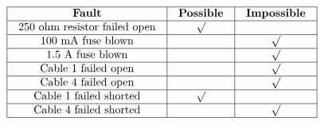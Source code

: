 






$$\vbox{\offinterlineskip
\halign{\strut
\vrule \quad\hfil # \ \hfil & 
\vrule \quad\hfil # \ \hfil & 
\vrule \quad\hfil # \ \hfil \vrule \cr
\noalign{\hrule}
%
{\bf Fault} & {\bf Possible} & {\bf Impossible} \cr
%
\noalign{\hrule}
%
250 ohm resistor failed open & $\surd$ &  \cr
%
\noalign{\hrule}
%
100 mA fuse blown &  & $\surd$ \cr
%
\noalign{\hrule}
%
1.5 A fuse blown &  & $\surd$ \cr
%
\noalign{\hrule}
%
Cable 1 failed open &  & $\surd$ \cr
%
\noalign{\hrule}
%
Cable 4 failed open &  & $\surd$ \cr
%
\noalign{\hrule}
%
Cable 1 failed shorted & $\surd$ &  \cr
%
\noalign{\hrule}
%
Cable 4 failed shorted &  & $\surd$ \cr
%
\noalign{\hrule}
} %
}$$ %











